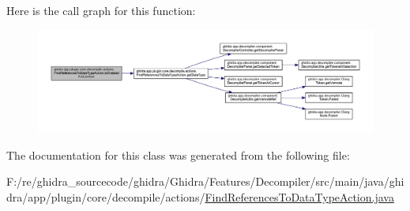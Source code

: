 Here is the call graph for this function\+:
\nopagebreak
\begin{figure}[H]
\begin{center}
\leavevmode
\includegraphics[width=350pt]{classghidra_1_1app_1_1plugin_1_1core_1_1decompile_1_1actions_1_1_find_references_to_data_type_action_a85d6965d0fd896bfb3b852a5e9ba2e86_cgraph}
\end{center}
\end{figure}


The documentation for this class was generated from the following file\+:\begin{DoxyCompactItemize}
\item 
F\+:/re/ghidra\+\_\+sourcecode/ghidra/\+Ghidra/\+Features/\+Decompiler/src/main/java/ghidra/app/plugin/core/decompile/actions/\mbox{\hyperlink{_find_references_to_data_type_action_8java}{Find\+References\+To\+Data\+Type\+Action.\+java}}\end{DoxyCompactItemize}

